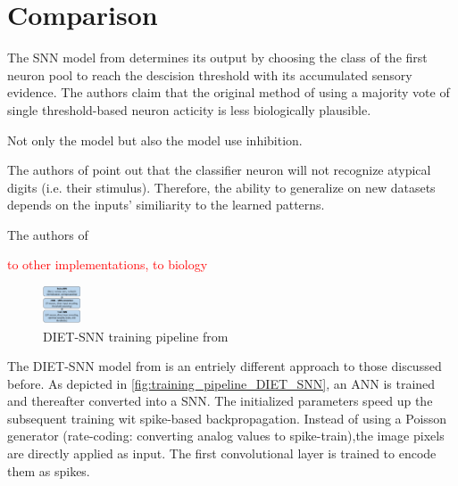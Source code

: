 \section{Comparison}
\label{sec:comparison}

The \ac{SNN} model from \cite{STDP_like} determines its output by 
choosing the class of the first neuron pool to reach the descision threshold with its accumulated sensory evidence.
The authors claim that the original method of using a majority vote of single threshold-based neuron acticity is less biologically plausible.

Not only the \cite{STDP_like} model but also the \cite{SNN} model use inhibition.

The authors of \cite{STDP_like} point out that the classifier neuron will not recognize atypical digits (i.e. their stimulus).
Therefore, the ability to generalize on new datasets depends on the inputs' similiarity to the learned patterns.

The authors of \cite{SNN} 

\textcolor{red}{to other implementations, to biology}

\begin{figure}
    \centering
    \vspace{-20pt}
    \includegraphics[width=0.1\textwidth]{pictures/DIET_SNN_pipeline.jpg}
    \caption{\ac{DIET}-\ac{SNN} training pipeline from \cite{DIET_SNN}}
    \label{fig:training_pipeline_DIET_SNN}
\end{figure}

The \ac{DIET}-\ac{SNN} model from \cite{DIET_SNN} is an entriely different approach to those discussed before.
As depicted in \autoref{fig:training_pipeline_DIET_SNN}, an \ac{ANN} is trained and thereafter converted into a \ac{SNN}.
The initialized parameters speed up the subsequent training wit spike-based backpropagation.
Instead of using a Poisson generator (rate-coding: converting analog values to spike-train),the image pixels are directly applied as input.
The first convolutional layer is trained to encode them as spikes.